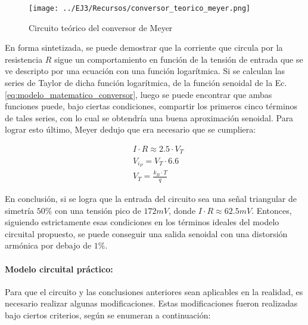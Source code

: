 \begin{figure}[H]
    \centering
    \texttt{[image: ../EJ3/Recursos/conversor\_teorico\_meyer.png]}
    \caption{Circuito te\'orico del conversor de Meyer}
    \label{fig:conversor_teorico_meyer}
\end{figure}

En forma sintetizada, se puede demostrar que la corriente que circula por la resistencia $R$ sigue un comportamiento en funci\'on de la tensi\'on de entrada que se ve descripto
por una ecuaci\'on con una funci\'on logar\'itmica. Si se calculan las series de Taylor de dicha funci\'on logar\'itmica, de la funci\'on senoidal de la Ec. \ref{eq:modelo_matematico_conversor},
luego se puede encontrar que ambas funciones puede, bajo ciertas condiciones, compartir los primeros cinco t\'erminos de tales series, con lo cual se obtendr\'ia una buena aproximaci\'on senoidal. 
Para lograr esto \'ultimo, Meyer dedujo que era necesario que se cumpliera:

\begin{align}
    & I \cdot R \approx 2.5 \cdot V_T \\
    & V_{i_{P}} = V_T \cdot 6.6 \\
    & V_T = \frac{k_B \cdot T}{q}
\end{align}


En conclusi\'on, si se logra que la entrada del circuito sea una se\~nal triangular de simetr\'ia $50\%$ con una tensi\'on pico de $172mV$, donde $I \cdot R \approx 62.5mV$. Entonces,
siguiendo estrictamente esas condiciones en los t\'erminos ideales del modelo circuital propuesto, se puede conseguir una salida senoidal con una distorsi\'on arm\'onica por debajo de $1\%$.

\paragraph{Modelo circuital pr\'actico:} Para que el circuito y las conclusiones anteriores sean aplicables en la realidad, es necesario realizar algunas modificaciones. Estas modificaciones
fueron realizadas bajo ciertos criterios, seg\'un se enumeran a continuaci\'on:

